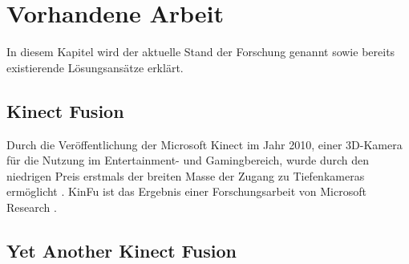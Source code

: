 
\chapter{Vorhandene Arbeit}
\label{ch:vorhandene-arbeit}

In diesem Kapitel wird der aktuelle Stand der Forschung genannt sowie bereits existierende Lösungsansätze erklärt.


\section{Kinect Fusion}
\label{sec:kinfu}

Durch die Veröffentlichung der Microsoft Kinect im Jahr 2010, einer 3D-Kamera für die Nutzung im Entertainment- und Gamingbereich, wurde durch den niedrigen Preis erstmals der breiten Masse der Zugang zu Tiefenkameras ermöglicht \cite[1:55]{kinfuTalkYoutube}.
\ac{KinFu} ist das Ergebnis einer Forschungsarbeit von Microsoft Research \cite{izadi2011kinectfusion}.

\section{Yet Another Kinect Fusion}
\label{sec:yak}
